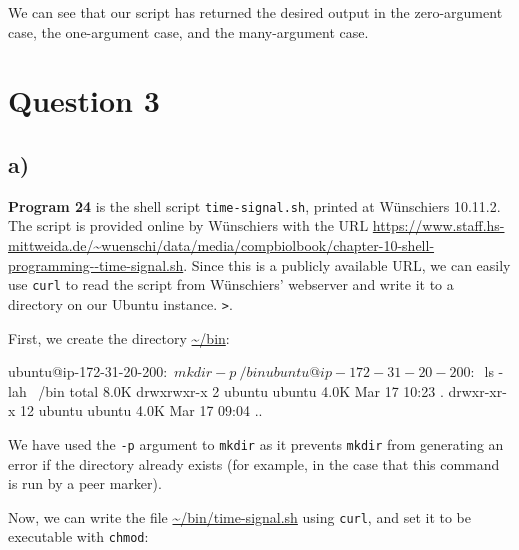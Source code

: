 \documentclass{article}
\begin{document}
We can see that our script has returned the desired output in the zero-argument case, the one-argument case, and the many-argument case.

\section{Question 3}

\subsection{a)}

\textbf{Program 24} is the shell script \texttt{time-signal.sh}, printed at Wünschiers 10.11.2. The script is provided online by Wünschiers with the URL
\url{https://www.staff.hs-mittweida.de/~wuenschi/data/media/compbiolbook/chapter-10-shell-programming--time-signal.sh}. Since this is a publicly available URL, we can easily use \texttt{curl} to read the script from Wünschiers' webserver and write it to a directory on our Ubuntu instance. \texttt{>}.

First, we create the directory \url{~/bin}:
\begin{bashinline}
ubuntu@ip-172-31-20-200:~$ mkdir -p ~/bin
ubuntu@ip-172-31-20-200:~$ ls -lah ~/bin
total 8.0K
drwxrwxr-x  2 ubuntu ubuntu 4.0K Mar 17 10:23 .
drwxr-xr-x 12 ubuntu ubuntu 4.0K Mar 17 09:04 ..
\end{bashinline}

We have used the \texttt{-p} argument to \texttt{mkdir} as it prevents \texttt{mkdir} from generating an error if the directory already exists (for example, in the case that this command is run by a peer marker).

Now, we can write the file \url{~/bin/time-signal.sh} using \texttt{curl}, and set it to be executable with \texttt{chmod}:

\end{document}
